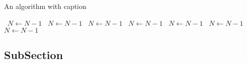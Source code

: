 \documentclass[a4paper]{article}
\begin{document}
\begin{algorithm}
\caption{An algorithm with caption}
\begin{algorithmic}
\    \State $N \gets N - 1$
\    \State $N \gets N - 1$
\    \State $N \gets N - 1$
\    \State $N \gets N - 1$
\    \State $N \gets N - 1$
\    \State $N \gets N - 1$
\    \State $N \gets N - 1$
\EndWhile
\end{algorithmic}
\end{algorithm}

\subsection{SubSection}
\end{document}
